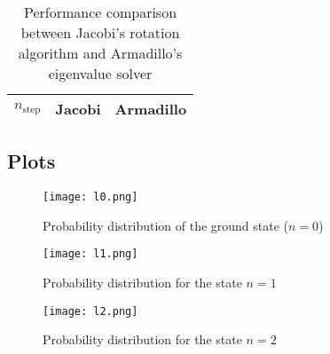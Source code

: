\documentclass[a4paper]{revtex4}
\begin{document}
\begin{table}
  \begin{tabular}{|r|rr|}
    \hline
    $n_\text{step}$ & Jacobi & Armadillo \\
    \hline
    
    \hline
  \end{tabular}
  \caption{Performance comparison between Jacobi's rotation algorithm and
  Armadillo's eigenvalue solver}
  \label{tab:perf}
\end{table}

\subsection{Plots}

\begin{figure}
  \centering \texttt{[image: l0.png]}
  \caption{Probability distribution of the ground state ($n = 0$)}
  \label{fig:n0}
\end{figure}
\begin{figure}
  \centering \texttt{[image: l1.png]}
  \caption{Probability distribution for the state $n = 1$}
  \label{fig:n1}
\end{figure}
\begin{figure}
  \centering \texttt{[image: l2.png]}
  \caption{Probability distribution for the state $n = 2$}
  \label{fig:n2}
\end{figure}
\end{document}
